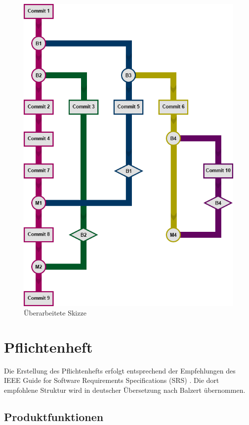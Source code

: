 \documentclass[color, ddc]{tudscrreprt}
\begin{document}
\newpage
\begin{figure}[ht!]
\centering
\includegraphics[width=\textwidth]{Skizzen/2015-01 VisualisierungsSkizze-rev.png}
\caption{Überarbeitete Skizze}
\end{figure}

\chapter{Pflichtenheft}

Die Erstellung des Pflichtenhefts erfolgt entsprechend der Empfehlungen des IEEE Guide for Software Requirements Specifications (SRS) \cite{ieee1998ieee}. Die dort empfohlene Struktur wird in deutscher Übersetzung nach Balzert \cite{balzert2009lehrbuch} übernommen.

\section{Produktfunktionen}
\end{document}
